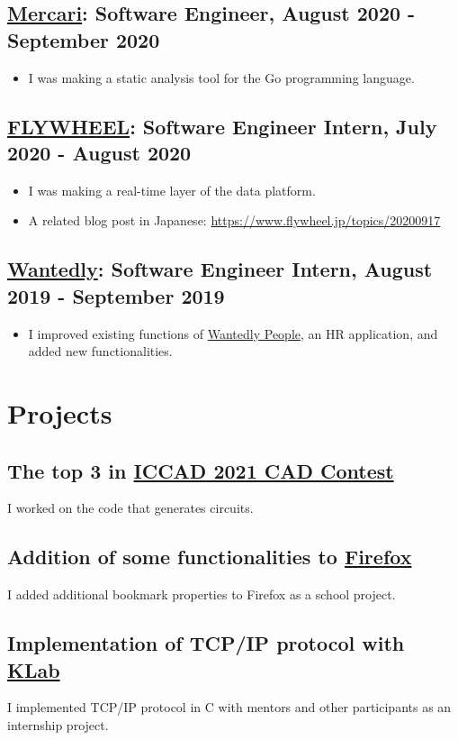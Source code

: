 \documentclass[12pt]{article}
\begin{document}
  \subsection*{\href{https://about.mercari.com/en}{Mercari}: Software Engineer, August 2020 - September 2020}
    \begin{itemize}
      \item I was making a static analysis tool for the Go programming language.
    \end{itemize}
  \subsection*{\href{https://www.flywheel.jp}{FLYWHEEL}: Software Engineer Intern, July 2020 - August 2020}
    \begin{itemize}
      \item I was making a real-time layer of the data platform.
      \item A related blog post in Japanese: \url{https://www.flywheel.jp/topics/20200917}
    \end{itemize}
  \subsection*{\href{https://wantedlyinc.com/ja}{Wantedly}: Software Engineer Intern, August 2019 - September 2019}
    \begin{itemize}
      \item I improved existing functions of \href{https://people.wantedly.com/}{Wantedly People}, an HR application, and added new functionalities.
    \end{itemize}

\section*{Projects}
  \subsection*{The top 3 in \href{http://iccad-contest.org/2021/}{ICCAD 2021 CAD Contest}}
    I worked on the code that generates circuits.
  \subsection*{Addition of some functionalities to \href{https://slides.com/diohabara/deck}{Firefox}}
    I added additional bookmark properties to Firefox as a school project.
  \subsection*{Implementation of TCP/IP protocol with \href{https://www.klab.com/en/}{KLab}}
    I implemented TCP/IP protocol in C with mentors and other participants as an internship project.
\end{document}

